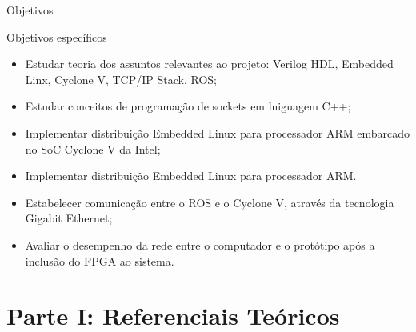 \documentclass[10pt]{beamer}
\begin{document}
\begin{frame}{Objetivos}
	\begin{alertblock}{Objetivos específicos}
        \begin{itemize}
        	\item Estudar teoria dos assuntos relevantes ao projeto: Verilog HDL, Embedded Linx,
			Cyclone V, TCP/IP Stack, ROS;
        	\item Estudar conceitos de programação de sockets em lniguagem C++;
        	\item Implementar distribuição Embedded Linux para processador ARM embarcado no
			SoC Cyclone V da Intel;
        	\item Implementar distribuição Embedded Linux para processador ARM.
        	\item Estabelecer comunicação entre o ROS e o Cyclone V, através da tecnologia Gigabit
			Ethernet;
        	\item Avaliar o desempenho da rede entre o computador e o protótipo após a inclusão do
			FPGA ao sistema.
        \end{itemize}
	\end{alertblock}
\end{frame}




\section{Parte I: Referenciais Teóricos}




\end{document}
